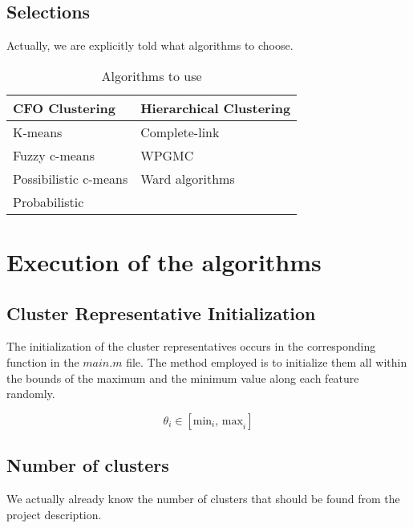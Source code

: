 \documentclass[12pt, a4paper]{article}
\begin{document}
\subsection{Selections}

Actually, we are explicitly told what algorithms to choose.

\begin{table}[H]
    \caption{Algorithms to use}\label{tab:choices}
    \begin{center}
        \begin{tabular}{l|l}
            \hline
            \textbf{CFO Clustering} & \textbf{Hierarchical Clustering} \\
            \hline
            K-means & Complete-link \\
            Fuzzy c-means & WPGMC \\
            Possibilistic c-means & Ward algorithms \\
            Probabilistic \\
            \hline
        \end{tabular}
    \end{center}
\end{table}

\section{Execution of the algorithms}

\subsection{Cluster Representative Initialization}

The initialization of the cluster representatives occurs in the corresponding function in the $main.m$ file. The method employed is to initialize them all within the bounds of the maximum and the minimum value along each feature randomly.

\[\theta_i \in \left[\text{min}_i \text{, max}_i\right]\]

\subsection{Number of clusters}

We actually already know the number of clusters that should be found from the project description.%
\end{document}
